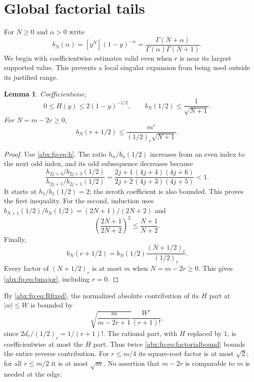 \documentclass[11pt,letterpaper]{article}
\numberwithin{equation}{section}
\newtheorem{lemma}[theorem]{Lemma}
\theoremstyle{remark}\newtheorem{remark}[theorem]{Remark}
\begin{document}
\section{Global factorial tails}\label{abx:fp:sec:tails}
For $N\ge0$ and $\alpha>0$ write
\[
 b_N(\alpha)=[y^N](1-y)^{-\alpha}
       =\frac{\Gamma(N+\alpha)}{\Gamma(\alpha)\Gamma(N+1)}.
\]
We begin with coefficientwise estimates valid even when $r$ is near
its largest supported value. This prevents a local singular expansion
from being used outside its justified range.

\begin{lemma}\label{abx:fp:lem:majorant}
Coefficientwise,
\begin{equation}\label{abx:fp:eq:majorant}
 0\le H(y)\le2(1-y)^{-1/2},\qquad
 b_N(1/2)\le\frac1{\sqrt{N+1}}.
\end{equation}
For $N=m-2r\ge0$,
\begin{equation}\label{abx:fp:eq:bmajor}
 b_N(r+1/2)\le\frac{m^r}{(1/2)_r\sqrt{N+1}}.
\end{equation}
\end{lemma}
\begin{proof}
Use \eqref{abx:fp:eq:h}. The ratio $h_n/b_n(1/2)$ increases from an even
index to the next odd index, and its odd subsequence decreases because
\[
 \frac{h_{2j+3}/b_{2j+3}(1/2)}{h_{2j+1}/b_{2j+1}(1/2)}
 =\frac{2j+1}{2j+2}
   \frac{(4j+4)(4j+6)}{(4j+3)(4j+5)}<1.
\]
It starts at $h_1/b_1(1/2)=2$; the zeroth coefficient is also bounded.
This proves the first inequality. For the second, induction uses
$b_{N+1}(1/2)/b_N(1/2)=(2N+1)/(2N+2)$ and
\[
 \left(\frac{2N+1}{2N+2}\right)^2\le\frac{N+1}{N+2}.
\]
Finally,
\[
 b_N(r+1/2)=b_N(1/2)\frac{(N+1/2)_r}{(1/2)_r}.
\]
Every factor of $(N+1/2)_r$ is at most $m$ when $N=m-2r\ge0$.
This gives \eqref{abx:fp:eq:bmajor}, including $r=0$.
\end{proof}

By \eqref{abx:fp:eq:Rfixed}, the normalized absolute contribution of its
$H$ part at $|w|\le W$ is bounded by
\begin{equation}\label{abx:fp:eq:factorialbound}
 \sqrt{\frac{m}{m-2r+1}}\frac{W^r}{(r+1)!},
\end{equation}
since $2d_r/(1/2)_r=1/(r+1)!$. The rational part, with $H$ replaced
by $1$, is coefficientwise at most the $H$ part. Thus twice
\eqref{abx:fp:eq:factorialbound} bounds the entire reverse contribution.
For $r\le m/4$ its square-root factor is at most $\sqrt2$; for all
$r\le m/2$ it is at most $\sqrt m$. No assertion that $m-2r$ is
comparable to $m$ is needed at the edge.
\end{document}
